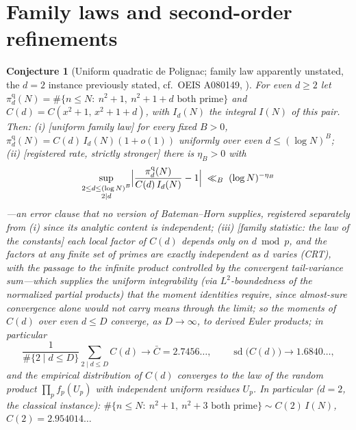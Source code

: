 \documentclass[11pt]{article}
\newtheorem{conjecture}{Conjecture}
\theoremstyle{definition}
\begin{document}
\section{Family laws and second-order refinements}

\setcounter{conjecture}{9}%
\begin{conjecture}[Uniform quadratic de Polignac; family law apparently
unstated, the $d=2$ instance previously stated, cf.\ OEIS A080149,
\cite{Carella}]\label{c1}
For even $d\ge2$ let
$\pi^{\mathrm q}_d(N)=\#\{n\le N:\ n^2+1,\ n^2+1+d \text{ both
prime}\}$ and $C(d)=C(x^2+1,\,x^2+1+d)$, with $I_d(N)$ the integral
$I(N)$ of this pair.  Then:
\emph{(i)} [uniform family law] for every fixed $B>0$,
$\pi^{\mathrm q}_d(N)=C(d)\,I_d(N)(1+o(1))$ uniformly over even
$d\le(\log N)^{B}$;
\emph{(ii)} [registered rate, strictly stronger] there is
$\eta_B>0$ with
\[
\sup_{\substack{2\le d\le(\log N)^{B}\\ 2\mid d}}
\Bigl|\frac{\pi^{\mathrm q}_d(N)}{C(d)\,I_d(N)}-1\Bigr|
\;\ll_B\;(\log N)^{-\eta_B}
\]
---an error clause that no version of Bateman--Horn supplies, registered
separately from (i) since its analytic content is independent;
\emph{(iii)} [family statistic: the law of the constants]
each local factor of $C(d)$ depends only on $d\bmod p$, and the
factors at any \emph{finite} set of primes are exactly independent
as $d$ varies (CRT), with the passage to the infinite product
controlled by the convergent tail-variance sum---which supplies the
uniform integrability (via $L^2$-boundedness of the normalized
partial products) that the moment identities require, since
almost-sure convergence alone would not carry means through the
limit; so the moments of
$C(d)$ over even $d\le D$ converge, as $D\to\infty$, to
\emph{derived} Euler products; in particular
\[
\frac1{\#\{2\mid d\le D\}}\sum_{2\mid d\le D}C(d)\to\bar C=2.7456\ldots,
\qquad
\operatorname{sd}\bigl(C(d)\bigr)\to1.6840\ldots,
\]
and the empirical distribution of $C(d)$ converges to the law of the
random product $\prod_p f_p(U_p)$ with independent uniform residues
$U_p$.  In particular ($d=2$, the classical instance):
$\#\{n\le N:\ n^2+1,\ n^2+3 \text{ both prime}\}\sim C(2)\,I(N)$,
$C(2)=2.954014\ldots$
\end{conjecture}
\end{document}
